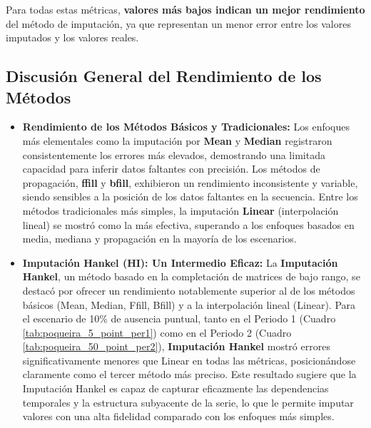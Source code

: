  Para todas estas métricas, \textbf{valores más bajos indican un mejor rendimiento} del método de imputación, ya que representan un menor error entre los valores imputados y los valores reales.

\subsection*{Discusión General del Rendimiento de los Métodos}

\begin{itemize}
    \item \textbf{Rendimiento de los Métodos Básicos y Tradicionales:}
    Los enfoques más elementales como la imputación por \textbf{Mean} y \textbf{Median} registraron consistentemente los errores más elevados, demostrando una limitada capacidad para inferir datos faltantes con precisión. Los métodos de propagación, \textbf{\gls{ffill}} y \textbf{\gls{bfill}}, exhibieron un rendimiento inconsistente y variable, siendo sensibles a la posición de los datos faltantes en la secuencia. Entre los métodos tradicionales más simples, la imputación \textbf{Linear} (interpolación lineal) se mostró como la más efectiva, superando a los enfoques basados en media, mediana y propagación en la mayoría de los escenarios.

    \item \textbf{Imputación Hankel (HI): Un Intermedio Eficaz:}
    La \textbf{Imputación Hankel}, un método basado en la completación de matrices de bajo rango, se destacó por ofrecer un rendimiento notablemente superior al de los métodos básicos (Mean, Median, Ffill, Bfill) y a la interpolación lineal (Linear). Para el escenario de 10\% de ausencia puntual, tanto en el Periodo 1 (Cuadro \ref{tab:poqueira_5_point_per1}) como en el Periodo 2 (Cuadro \ref{tab:poqueira_50_point_per2}), \textbf{Imputación Hankel} mostró errores significativamente menores que Linear en todas las métricas, posicionándose claramente como el tercer método más preciso. Este resultado sugiere que la Imputación Hankel es capaz de capturar eficazmente las dependencias temporales y la estructura subyacente de la serie, lo que le permite imputar valores con una alta fidelidad comparado con los enfoques más simples.


\end{itemize}
